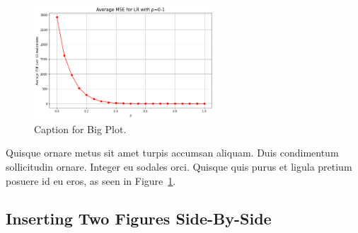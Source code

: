 \documentclass[a4paper, 11pt]{article}
\begin{document}
\begin{figure}[H]
\begin{center}
    \includegraphics[width=0.6\textwidth]{../graphs/bigplot1}
    \caption{Caption for Big Plot.}
    \label{fig:bigplot1}
\end{center}
\end{figure}

Quisque ornare metus sit amet turpis accumsan aliquam. Duis condimentum sollicitudin ornare. Integer eu sodales orci. Quisque quis purus et ligula pretium posuere id eu eros, as seen in Figure~\ref{fig:bigplot1}.

\subsection{Inserting Two Figures Side-By-Side}
\end{document}
